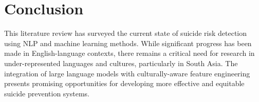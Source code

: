 \documentclass[12pt,a4paper]{article}
\begin{document}
\section{Conclusion}

This literature review has surveyed the current state of suicide risk detection using NLP and machine learning methods. While significant progress has been made in English-language contexts, there remains a critical need for research in under-represented languages and cultures, particularly in South Asia. The integration of large language models with culturally-aware feature engineering presents promising opportunities for developing more effective and equitable suicide prevention systems.
\end{document}
